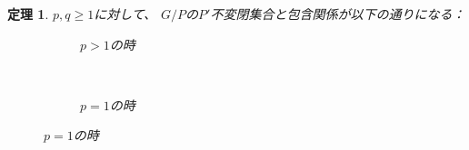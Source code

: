 \documentclass[12pt]{msjproc} %
\newtheorem{theorem}{定理}
\begin{document}
\begin{theorem}
$p, q \geqslant 1$に対して、
  $G/P$の$P'$不変閉集合と{包含関係}が以下の通りになる：\\
  \begin{figure}[H]
	  \vspace{-4ex}
    \centering
    \begin{subfigure}{0.3\textwidth}
	\caption{$p>1$の時}
    \end{subfigure}
    ~ %
    \begin{subfigure}{0.3\textwidth}
	\raisebox{40mm}
	{}
	\caption{$p=1$の時}
    \end{subfigure}
\end{figure}
\end{theorem}
\end{document}
